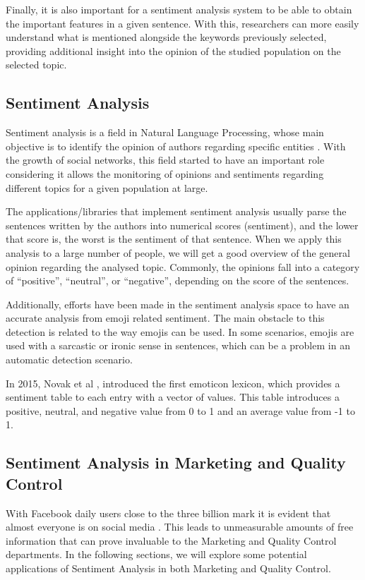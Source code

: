 \documentclass[runningheads]{llncs}
\begin{document}
Finally, it is also important for a sentiment analysis system to be able to obtain the important features in a given sentence. With this, researchers can more easily understand what is mentioned alongside the keywords previously selected, providing additional insight into the opinion of the studied population on the selected topic.

\subsection{Sentiment Analysis}

Sentiment analysis is a field in Natural Language Processing, whose main objective is to identify the opinion of authors regarding specific entities \cite{10.1371/journal.pone.0144296}. With the growth of social networks, this field started to have an important role considering it allows the monitoring of opinions and sentiments regarding different topics for a given population at large. 

The applications/libraries that implement sentiment analysis usually parse the sentences written by the authors into numerical scores (sentiment), and the lower that score is, the worst is the sentiment of that sentence.  When we apply this analysis to a large number of people, we will get a good overview of the general opinion regarding the analysed topic. Commonly, the opinions fall into a category of “positive”, “neutral”, or “negative”, depending on the score of the sentences.  

Additionally, efforts have been made in the sentiment analysis space to have an accurate analysis from emoji related sentiment. The main obstacle to this detection is related to the way emojis can be used. In some scenarios, emojis are used with a sarcastic or ironic sense in sentences, which can be a problem in an automatic detection scenario. 

In 2015, Novak et al \cite{10.1371/journal.pone.0144296}, introduced the first emoticon lexicon, which provides a sentiment table to each entry with a vector of values. This table introduces a positive, neutral, and negative value from 0 to 1 and an average value from -1 to 1. 

\subsection{Sentiment Analysis in Marketing and Quality Control}

With Facebook daily users close to the three billion mark it is evident that almost everyone is on social media \cite{Statista}. This leads to unmeasurable amounts of free information that can prove invaluable to the Marketing and Quality Control departments. In the following sections, we will explore some potential applications of Sentiment Analysis in both Marketing and Quality Control.  
\end{document}
